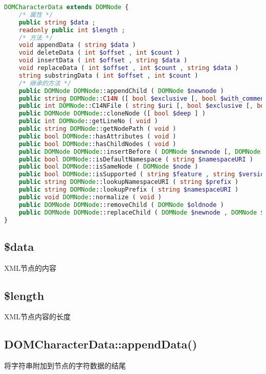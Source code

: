 \begin{lstlisting}[language=PHP]
DOMCharacterData extends DOMNode {
    /* 属性 */
    public string $data ;
    readonly public int $length ;
    /* 方法 */
    void appendData ( string $data )
    void deleteData ( int $offset , int $count )
    void insertData ( int $offset , string $data )
    void replaceData ( int $offset , int $count , string $data )
    string substringData ( int $offset , int $count )
    /* 继承的方法 */
    public DOMNode DOMNode::appendChild ( DOMNode $newnode )
    public string DOMNode::C14N ([ bool $exclusive [, bool $with_comments [, array $xpath [, array $ns_prefixes ]]]] )
    public int DOMNode::C14NFile ( string $uri [, bool $exclusive [, bool $with_comments [, array $xpath [, array $ns_prefixes ]]]] )
    public DOMNode DOMNode::cloneNode ([ bool $deep ] )
    public int DOMNode::getLineNo ( void )
    public string DOMNode::getNodePath ( void )
    public bool DOMNode::hasAttributes ( void )
    public bool DOMNode::hasChildNodes ( void )
    public DOMNode DOMNode::insertBefore ( DOMNode $newnode [, DOMNode $refnode ] )
    public bool DOMNode::isDefaultNamespace ( string $namespaceURI )
    public bool DOMNode::isSameNode ( DOMNode $node )
    public bool DOMNode::isSupported ( string $feature , string $version )
    public string DOMNode::lookupNamespaceURI ( string $prefix )
    public string DOMNode::lookupPrefix ( string $namespaceURI )
    public void DOMNode::normalize ( void )
    public DOMNode DOMNode::removeChild ( DOMNode $oldnode )
    public DOMNode DOMNode::replaceChild ( DOMNode $newnode , DOMNode $oldnode )
}
\end{lstlisting}

\subsection{\$data}

XML节点的内容


\subsection{\$length}

XML节点内容的长度

\subsection{DOMCharacterData::appendData()}

将字符串附加到节点的字符数据的结尾


